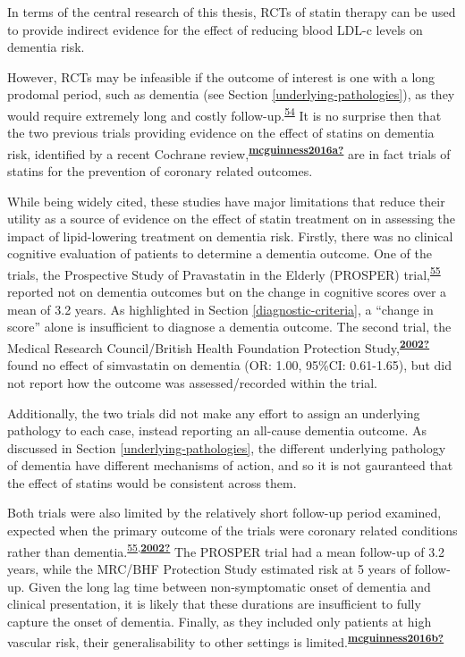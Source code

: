 \documentclass[a4paper, twoside]{templates/ociamthesis}
\begin{document}
In terms of the central research of this thesis, RCTs of statin therapy can be used to provide indirect evidence for the effect of reducing blood LDL-c levels on dementia risk.

However, RCTs may be infeasible if the outcome of interest is one with a long prodomal period, such as dementia (see Section \ref{underlying-pathologies}), as they would require extremely long and costly follow-up.\textsuperscript{\protect\hyperlink{ref-ritchie2015}{54}} It is no surprise then that the two previous trials providing evidence on the effect of statins on dementia risk, identified by a recent Cochrane review,\textsuperscript{\protect\hyperlink{ref-mcguinness2016a}{\textbf{mcguinness2016a?}}} are in fact trials of statins for the prevention of coronary related outcomes.

While being widely cited, these studies have major limitations that reduce their utility as a source of evidence on the effect of statin treatment on in assessing the impact of lipid-lowering treatment on dementia risk. Firstly, there was no clinical cognitive evaluation of patients to determine a dementia outcome. One of the trials, the Prospective Study of Pravastatin in the Elderly (PROSPER) trial,\textsuperscript{\protect\hyperlink{ref-trompet2010}{55}} reported not on dementia outcomes but on the change in cognitive scores over a mean of 3.2 years. As highlighted in Section \ref{diagnostic-criteria}, a ``change in score'' alone is insufficient to diagnose a dementia outcome. The second trial, the Medical Research Council/British Health Foundation Protection Study,\textsuperscript{\protect\hyperlink{ref-2002}{\textbf{2002?}}} found no effect of simvastatin on dementia (OR: 1.00, 95\%CI: 0.61-1.65), but did not report how the outcome was assessed/recorded within the trial.

Additionally, the two trials did not make any effort to assign an underlying pathology to each case, instead reporting an all-cause dementia outcome. As discussed in Section \ref{underlying-pathologies}, the different underlying pathology of dementia have different mechanisms of action, and so it is not gauranteed that the effect of statins would be consistent across them.

Both trials were also limited by the relatively short follow-up period examined, expected when the primary outcome of the trials were coronary related conditions rather than dementia.\textsuperscript{\protect\hyperlink{ref-trompet2010}{55},\protect\hyperlink{ref-2002}{\textbf{2002?}}} The PROSPER trial had a mean follow-up of 3.2 years, while the MRC/BHF Protection Study estimated risk at 5 years of follow-up. Given the long lag time between non-symptomatic onset of dementia and clinical presentation, it is likely that these durations are insufficient to fully capture the onset of dementia. Finally, as they included only patients at high vascular risk, their generalisability to other settings is limited.\textsuperscript{\protect\hyperlink{ref-mcguinness2016b}{\textbf{mcguinness2016b?}}}
\end{document}
